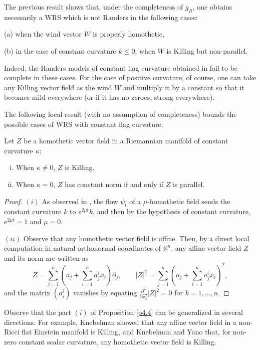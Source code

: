 \documentclass[reqno,10pt]{amsart}
\newcommand{\R}{\mathds R}
\begin{document}
\begin{rem}\label{r_cocotazo}

The previous result shows that, under the completeness of $g_R$, one obtains necessarily a WRS which is not Randers in the following cases: 

 (a) when the wind vector $W$ is properly homothetic, 


(b) in the case of constant curvature $k\leq 0$, when $W$ is Killing but non-parallel.

 Indeed, the Randers models of constant flag curvature obtained in \cite{BR, BRS} fail to be complete in these cases. For the case of positive curvature, of course, one can take any Killing vector field as the wind $W$ and multiply it by a constant so that it becomes mild  everywhere (or if it has no zeroes, strong everywhere).
\end{rem}
 The following local result (with no assumption of completeness) bounds the possible cases of WRS with constant flag curvature.
\begin{prop}\label{p4.4} Let $Z$ be a homothetic vector field  in a  Riemannian  manifold of constant curvature $\kappa$:
\begin{enumerate}[(i)]
\item When $ \kappa \neq 0$,  $Z$  is Killing. 

\item  When $ \kappa  =0$,   $Z$ 
 has  constant norm if and only if  $Z$ 
is  parallel. 
\end{enumerate}
\end{prop}

\begin{proof}
$(i)$  As observed in \cite[\S 3.2.1]{BRS}, the flow $\psi_t$ of a $\mu$-homothetic field sends the constant curvature $k$ to $e^{2\mu t}k$, and then by the hypothesis of constant curvature, $e^{2\mu t}=1$ and $\mu=0$. 

$(ii)$   Observe that any homothetic vector field is affine. Then,  by a direct local computation  in natural orthonormal coordinates of $\R^n$, any affine vector field $Z$  and its norm are written as 
$$
Z=\sum_{j=1}^n \left(a_j +\sum_{i=1}^n a^i_j x_i\right) \partial_j ,\qquad | Z|^2= \sum_{j=1}^n \left(a_j +\sum_{i=1}^n a^i_j  x_i\right)^2 ,
$$
and the matrix $(a_i^j)$  vanishes by equating $\frac{\partial^2}{\partial x_k^2} | Z|^2=0$ for  $k=1,\dots , n$.
  \end{proof}
\begin{rem}
 Observe that the part $(i)$ of Proposition \ref{p4.4} can be generalized in several directions. For example,   Knebelman \cite[Theorem 4 and below]{Kne45} showed that any affine vector field in a non-Ricci flat Einstein manifold is Killing, and  Knebelman and Yano \cite[Theorem 2]{KneYan60}
 that,  for non-zero
constant  scalar curvature,  any homothetic vector field is Killing. 
\end{rem}
\end{document}
